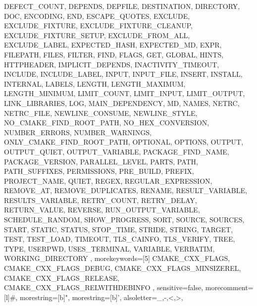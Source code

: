 {{      DEFECT_COUNT, DEPENDS, DEPFILE, DESTINATION, DIRECTORY, DOC,
      ENCODING, END, ESCAPE_QUOTES, EXCLUDE, EXCLUDE_FIXTURE,
      EXCLUDE_FIXTURE_CLEANUP, EXCLUDE_FIXTURE_SETUP, EXCLUDE_FROM_ALL,
      EXCLUDE_LABEL, EXPECTED_HASH, EXPECTED_MD, EXPR, FILEPATH, FILES,
      FILTER, FIND, FLAGS, GET, GLOBAL, HINTS, HTTPHEADER,
      IMPLICIT_DEPENDS, INACTIVITY_TIMEOUT, INCLUDE, INCLUDE_LABEL, INPUT,
      INPUT_FILE, INSERT, INSTALL, INTERNAL, LABELS, LENGTH,
      LENGTH_MAXIMUM, LENGTH_MINIMUM, LIMIT_COUNT, LIMIT_INPUT,
      LIMIT_OUTPUT, LINK_LIBRARIES, LOG, MAIN_DEPENDENCY, MD, NAMES, NETRC,
      NETRC_FILE, NEWLINE_CONSUME, NEWLINE_STYLE, NO_CMAKE_FIND_ROOT_PATH,
      NO_HEX_CONVERSION, NUMBER_ERRORS, NUMBER_WARNINGS,
      ONLY_CMAKE_FIND_ROOT_PATH, OPTIONAL, OPTIONS, OUTPUT, OUTPUT_QUIET,
      OUTPUT_VARIABLE, PACKAGE_FIND_NAME, PACKAGE_VERSION, PARALLEL_LEVEL,
      PARTS, PATH, PATH_SUFFIXES, PERMISSIONS, PRE_BUILD, PREFIX,
      PROJECT_NAME, QUIET, REGEX, REGULAR_EXPRESSION, REMOVE_AT,
      REMOVE_DUPLICATES, RENAME, RESULT_VARIABLE, RESULTS_VARIABLE,
      RETRY_COUNT, RETRY_DELAY, RETURN_VALUE, REVERSE, RUN_OUTPUT_VARIABLE,
      SCHEDULE_RANDOM, SHOW_PROGRESS, SORT, SOURCE, SOURCES, START, STATIC,
      STATUS, STOP_TIME, STRIDE, STRING, TARGET, TEST, TEST_LOAD, TIMEOUT,
      TLS_CAINFO, TLS_VERIFY, TREE, TYPE, USERPWD, USES_TERMINAL, VARIABLE,
      VERBATIM, WORKING_DIRECTORY },
    morekeywords=[5]{ CMAKE_CXX_FLAGS, CMAKE_CXX_FLAGS_DEBUG,
      CMAKE_CXX_FLAGS_MINSIZEREL, CMAKE_CXX_FLAGS_RELEASE,
      CMAKE_CXX_FLAGS_RELWITHDEBINFO },
    sensitive=false,
    morecomment=[l]\#,
    morestring=[b]",
    morestring=[b]',
    alsoletter={_,-,<,>},
}%
